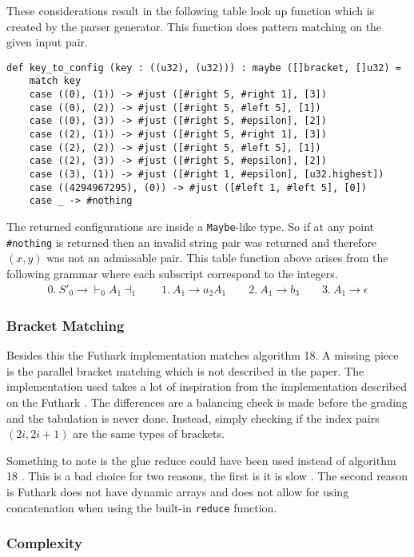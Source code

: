 These considerations result in the following table look up function which is created by the parser generator. This function does pattern matching on the given input pair.

\begin{lstlisting}[basicstyle=\ttfamily\scriptsize]
def key_to_config (key : ((u32), (u32))) : maybe ([]bracket, []u32) =
    match key
    case ((0), (1)) -> #just ([#right 5, #right 1], [3])
    case ((0), (2)) -> #just ([#right 5, #left 5], [1])
    case ((0), (3)) -> #just ([#right 5, #epsilon], [2])
    case ((2), (1)) -> #just ([#right 5, #right 1], [3])
    case ((2), (2)) -> #just ([#right 5, #left 5], [1])
    case ((2), (3)) -> #just ([#right 5, #epsilon], [2])
    case ((3), (1)) -> #just ([#right 1, #epsilon], [u32.highest])
    case ((4294967295), (0)) -> #just ([#left 1, #left 5], [0])
    case _ -> #nothing
\end{lstlisting}
The returned configurations are inside a \lstinline|Maybe|-like type. So if at any point \lstinline|#nothing| is returned then an invalid string pair was returned and therefore $(x,y)$ was not an admissable pair. This table function above arises from the following grammar where each subscript correspond to the integers.
\begin{align*}
    0. \: S'_0 \to \vdash_0 A_1 \dashv_1 \qquad 1. \: A_1 \to a_2 A_1 \qquad 2. \: A_1 \to b_3 \qquad 3. \: A_1 \to \epsilon
\end{align*}

\subsubsection{Bracket Matching}
Besides this the Futhark implementation matches algorithm 18. A missing piece is the parallel bracket matching which is not described in the paper. The implementation used takes a lot of inspiration from the implementation described on the Futhark \cite{futhark:parens}. The differences are a balancing check is made before the grading and the tabulation is never done. Instead, simply checking if the index pairs $(2i, 2i + 1)$ are the same types of brackets.

Something to note is the glue \cite[7]{Vagner2007} reduce could have been used instead of algorithm 18 \cite[18]{Vagner2007}. This is a bad choice for two reasons, the first is it is slow \cite[17]{Vagner2007}. The second reason is Futhark does not have dynamic arrays and does not allow for using concatenation when using the built-in \lstinline|reduce| function.

\subsubsection{Complexity}

